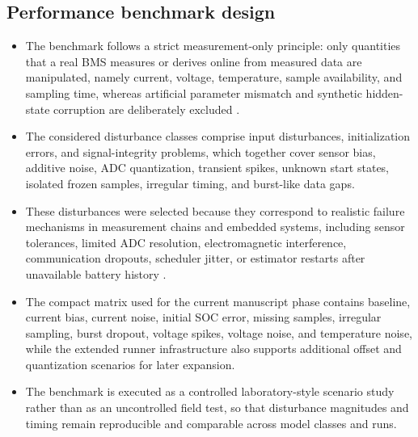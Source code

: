 \documentclass[review]{elsarticle}
\begin{document}
\subsection{Performance benchmark design}
\begin{itemize}[leftmargin=*]
    \item The benchmark follows a strict measurement-only principle: only quantities that a real BMS measures or derives online from measured data are manipulated, namely current, voltage, temperature, sample availability, and sampling time, whereas artificial parameter mismatch and synthetic hidden-state corruption are deliberately excluded \cite{bergerBenchmarkingBatteryManagement2024}.
    \item The considered disturbance classes comprise input disturbances, initialization errors, and signal-integrity problems, which together cover sensor bias, additive noise, ADC quantization, transient spikes, unknown start states, isolated frozen samples, irregular timing, and burst-like data gaps.
    \item These disturbances were selected because they correspond to realistic failure mechanisms in measurement chains and embedded systems, including sensor tolerances, limited ADC resolution, electromagnetic interference, communication dropouts, scheduler jitter, or estimator restarts after unavailable battery history \cite{liRobustnessSOCEstimation2015,naseriReliableWirelessBMS2025,bergerBenchmarkingBatteryManagement2024}.
    \item The compact matrix used for the current manuscript phase contains baseline, current bias, current noise, initial SOC error, missing samples, irregular sampling, burst dropout, voltage spikes, voltage noise, and temperature noise, while the extended runner infrastructure also supports additional offset and quantization scenarios for later expansion.
    \item The benchmark is executed as a controlled laboratory-style scenario study rather than as an uncontrolled field test, so that disturbance magnitudes and timing remain reproducible and comparable across model classes and runs.
\end{itemize}
\end{document}
